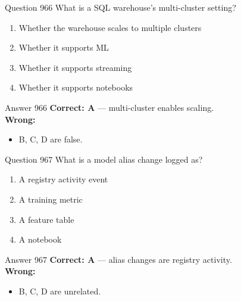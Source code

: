 \documentclass[aspectratio=169,11pt]{beamer}
\begin{document}
	\begin{frame}{Question 966}
		What is a SQL warehouse's multi-cluster setting?
		\begin{enumerate}[label=\Alph*.]
			\item Whether the warehouse scales to multiple clusters
			\item Whether it supports ML
			\item Whether it supports streaming
			\item Whether it supports notebooks
		\end{enumerate}
	\end{frame}
	\begin{frame}{Answer 966}
		\textbf{Correct: A} --- multi-cluster enables scaling.\\
		\vspace{0.5em}
		\textbf{Wrong:}
		\begin{itemize}
			\item B, C, D are false.
		\end{itemize}
	\end{frame}
	
	\begin{frame}{Question 967}
		What is a model alias change logged as?
		\begin{enumerate}[label=\Alph*.]
			\item A registry activity event
			\item A training metric
			\item A feature table
			\item A notebook
		\end{enumerate}
	\end{frame}
	\begin{frame}{Answer 967}
		\textbf{Correct: A} --- alias changes are registry activity.\\
		\vspace{0.5em}
		\textbf{Wrong:}
		\begin{itemize}
			\item B, C, D are unrelated.
		\end{itemize}
	\end{frame}
	
\end{document}
